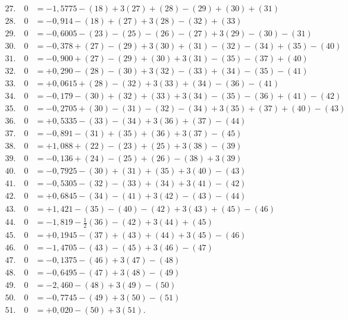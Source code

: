 \documentclass[12pt,a4paper]{article}
\theoremstyle{plain}
\theoremstyle{definition}
\theoremstyle{remark}
\begin{document}
\begin{align*}
27.\quad 0 &= -1{,}5775 - (18) + 3(27) + (28) - (29) + (30) + (31)\\
28.\quad 0 &= -0{,}914 - (18) + (27) + 3(28) - (32) + (33)\\
29.\quad 0 &= -0{,}6005 - (23) - (25) - (26) - (27) + 3(29) - (30) - (31)\\
30.\quad 0 &= -0{,}378 + (27) - (29) + 3(30) + (31) - (32) - (34) + (35) - (40)\\
31.\quad 0 &= -0{,}900 + (27) - (29) + (30) + 3(31) - (35) - (37) + (40)\\
32.\quad 0 &= +0{,}290 - (28) - (30) + 3(32) - (33) + (34) - (35) - (41)\\
33.\quad 0 &= +0{,}0615 + (28) - (32) + 3(33) + (34) - (36) - (41)\\
34.\quad 0 &= -0{,}179 - (30) + (32) + (33) + 3(34) - (35) - (36) + (41) - (42)\\
35.\quad 0 &= -0{,}2705 + (30) - (31) - (32) - (34) + 3(35) + (37) + (40) - (43)\\
36.\quad 0 &= +0{,}5335 - (33) - (34) + 3(36) + (37) - (44)\\
37.\quad 0 &= -0{,}891 - (31) + (35) + (36) + 3(37) - (45)\\
38.\quad 0 &= +1{,}088 + (22) - (23) + (25) + 3(38) - (39)\\
39.\quad 0 &= -0{,}136 + (24) - (25) + (26) - (38) + 3(39)\\
40.\quad 0 &= -0{,}7925 - (30) + (31) + (35) + 3(40) - (43)\\
41.\quad 0 &= -0{,}5305 - (32) - (33) + (34) + 3(41) - (42)\\
42.\quad 0 &= +0{,}6845 - (34) - (41) + 3(42) - (43) - (44)\\
43.\quad 0 &= +1{,}421 - (35) - (40) - (42) + 3(43) + (45) - (46)\\
44.\quad 0 &= -1{,}819 - \tfrac{1}{2}(36) - (42) + 3(44) + (45)\\
45.\quad 0 &= +0{,}1945 - (37) + (43) + (44) + 3(45) - (46)\\
46.\quad 0 &= -1{,}4705 - (43) - (45) + 3(46) - (47)\\
47.\quad 0 &= -0{,}1375 - (46) + 3(47) - (48)\\
48.\quad 0 &= -0{,}6495 - (47) + 3(48) - (49)\\
49.\quad 0 &= -2{,}460 - (48) + 3(49) - (50)\\
50.\quad 0 &= -0{,}7745 - (49) + 3(50) - (51)\\
51.\quad 0 &= +0{,}020 - (50) + 3(51).
\end{align*}
\end{document}
